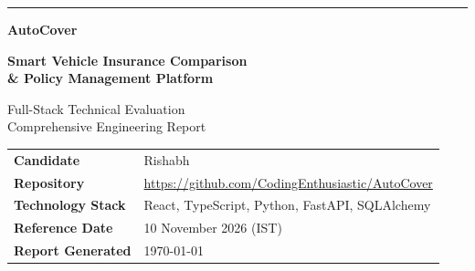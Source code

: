 \documentclass[11pt,a4paper]{article}
\begin{document}

\begin{titlepage}

\thispagestyle{empty}

\vspace*{1.0cm}

\begin{center}

{\color{Accent}\rule{0.85\textwidth}{2pt}}

\vspace{1.3cm}

{\Huge\bfseries\color{Navy} AutoCover}

\vspace{0.35cm}

{\Large\bfseries
Smart Vehicle Insurance Comparison\\
\& Policy Management Platform
}

\vspace{0.8cm}

{\large\color{Slate}
Full-Stack Technical Evaluation\\
Comprehensive Engineering Report
}

\vspace{1.4cm}


\vspace{1.8cm}

\begin{tcolorbox}[
    width=0.82\textwidth,
    colback=LightGray,
    colframe=MidGray,
    boxrule=0.6pt,
    arc=3mm,
    left=6mm,
    right=6mm,
    top=5mm,
    bottom=5mm
]

\begin{tabularx}{\linewidth}{@{}lY@{}}
    \textbf{Candidate} & Rishabh \\[5pt]
    \textbf{Repository} &
    \url{https://github.com/CodingEnthusiastic/AutoCover} \\[5pt]
    \textbf{Technology Stack} &
    React, TypeScript, Python, FastAPI, SQLAlchemy \\[5pt]
    \textbf{Reference Date} &
    10 November 2026 (IST) \\[5pt]
    \textbf{Report Generated} &
    \today
\end{tabularx}


\end{tcolorbox}
\end{center}
\end{titlepage}
\end{document}

